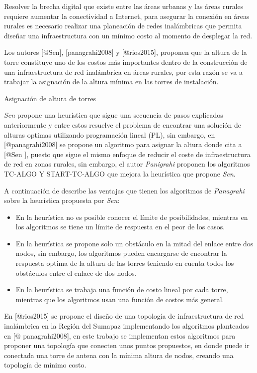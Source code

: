 \documentclass[]{article}
\begin{document}
Resolver la brecha digital que existe entre las áreas urbanas y las
áreas rurales requiere aumentar la conectividad a Internet, para
asegurar la conexión en áreas rurales es necesario realizar una
planeación de redes inalámbricas que permita diseñar una infraestructura
con un mínimo costo al momento de desplegar la red.

Los autores {[}@Sen{]}, {[}panagrahi2008{]} y {[}@rios2015{]}, proponen
que la altura de la torre constituye uno de los costos más importantes
dentro de la construcción de una infraestructura de red inalámbrica en
áreas rurales, por esta razón se va a trabajar la asignación de la
altura mínima en las torres de instalación.

Asignación de altura de torres

\emph{Sen} propone una heurística que sigue una secuencia de pasos
explicados anteriormente y entre estos resuelve el problema de encontrar
una solución de alturas optimas utilizando programación lineal (PL), sin
embargo, en {[}@panagrahi2008{]} se propone un algoritmo para asignar la
altura donde cita a {[}@Sen {]}, puesto que sigue el mismo enfoque de
reducir el coste de infraestructura de red en zonas rurales, sin
embargo, el autor \emph{Panigrahi} proponen los algoritmos TC-ALGO Y
START-TC-ALGO que mejora la heurística que propone \emph{Sen}.

A continuación de describe las ventajas que tienen los algoritmos de
\emph{Panagrahi} sobre la heurística propuesta por \emph{Sen}:

\begin{itemize}
\item
  En la heurística no es posible conocer el límite de posibilidades,
  mientras en los algoritmos se tiene un límite de respuesta en el peor
  de los casos.
\item
  En la heurística se propone solo un obstáculo en la mitad del enlace
  entre dos nodos, sin embargo, los algoritmos pueden encargarse de
  encontrar la respuesta optima de la altura de las torres teniendo en
  cuenta todos los obstáculos entre el enlace de dos nodos.
\item
  En la heurística se trabaja una función de costo lineal por cada
  torre, mientras que los algoritmos usan una función de costos más
  general.
\end{itemize}

En {[}@rios2015{]} se propone el diseño de una topología de
infraestructura de red inalámbrica en la Región del Sumapaz
implementando los algoritmos planteados en {[}@ panagrahi2008{]}, en
este trabajo se implementan estos algoritmos para proponer una topología
que conecten unos puntos propuestos, en donde puede ir conectada una
torre de antena con la mínima altura de nodos, creando una topología de
mínimo costo.
\end{document}
